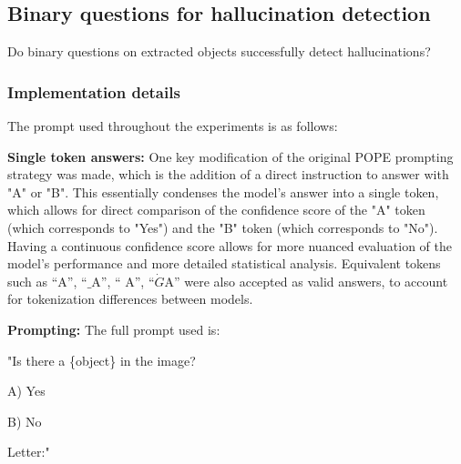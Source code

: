 \subsection{Binary questions for hallucination detection}

\begin{formal}{}
	Do binary questions on extracted objects successfully detect hallucinations?
\end{formal}



\subsubsection{Implementation details}

The prompt used throughout the experiments is as follows:
\begin{description}
	\item \textbf{Single token answers:} One key modification of the original POPE prompting strategy was made, which is the addition of a direct instruction to answer with "A" or "B". This essentially condenses the model's answer into a single token, which allows for direct comparison of the confidence score of the "A" token (which corresponds to "Yes") and the "B" token (which corresponds to "No"). Having a continuous confidence score allows for more nuanced evaluation of the model's performance and more detailed statistical analysis. Equivalent tokens such as ``A'', ``$\_$A'', `` A'', ``$\dot{G}$A'' were also accepted as valid answers, to account for tokenization differences between models.


	\item \textbf{Prompting:} The full prompt used is:

	      "Is there a \{object\} in the image?

	      A) Yes

	      B) No

	      Letter:"
\end{description}



